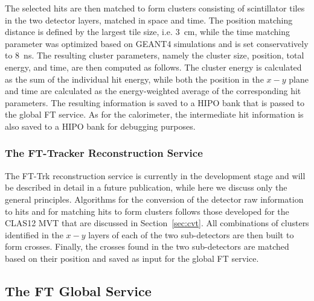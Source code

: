 The selected hits are then matched to form clusters consisting of scintillator tiles in the two detector layers,
matched in space and time. The position matching distance is defined by the largest tile size, i.e. 3~cm, while the
time matching parameter was optimized based on GEANT4 simulations and is set conservatively to 8~ns. The
resulting cluster parameters, namely the cluster size, position, total energy, and time, are then computed as follows.
The cluster energy is calculated as the sum of the individual hit energy, while both the position in the $x-y$ plane and
time are calculated as the energy-weighted average of the corresponding hit parameters. The resulting information
is saved to a HIPO bank that is passed to the global FT service. As for the calorimeter, the intermediate hit
information is also saved to a HIPO bank for debugging purposes.

\subsubsection{The FT-Tracker Reconstruction Service}

The FT-Trk reconstruction service is currently in the development stage and will be described in detail in a
future publication, while here we discuss only the general principles. Algorithms for the conversion of the detector
raw information to hits and for matching hits to form clusters follows those developed for the CLAS12 MVT that
are discussed in Section~\ref{sec:cvt}. All combinations of clusters identified in the $x-y$ layers of each of the
two sub-detectors are then built to form crosses. Finally, the  crosses found in the two sub-detectors are matched
based on their position and saved as input for the global FT service.

\subsection{The FT Global Service}

